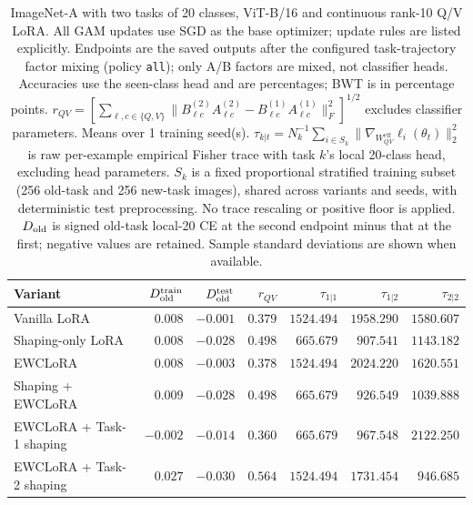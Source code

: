 \begin{table}[t]
\centering\scriptsize
\caption{ImageNet-A with two tasks of 20 classes, ViT-B/16 and continuous rank-10 Q/V LoRA. All GAM updates use SGD as the base optimizer; update rules are listed explicitly. Endpoints are the saved outputs after the configured task-trajectory factor mixing (policy \texttt{all}); only A/B factors are mixed, not classifier heads. Accuracies use the seen-class head and are percentages; BWT is in percentage points. $r_{QV}=\left[\sum_{\ell,c\in\{Q,V\}}\|B^{(2)}_{\ell c}A^{(2)}_{\ell c}-B^{(1)}_{\ell c}A^{(1)}_{\ell c}\|_F^2\right]^{1/2}$ excludes classifier parameters. Means over 1 training seed(s). $\tau_{k|t}=N_k^{-1}\sum_{i\in S_k}\|\nabla_{W^{\mathrm{eff}}_{QV}}\ell_i(\theta_t)\|_2^2$ is raw per-example empirical Fisher trace with task $k$'s local 20-class head, excluding head parameters. $S_k$ is a fixed proportional stratified training subset (256 old-task and 256 new-task images), shared across variants and seeds, with deterministic test preprocessing. No trace rescaling or positive floor is applied. $D_{\rm old}$ is signed old-task local-20 CE at the second endpoint minus that at the first; negative values are retained. Sample standard deviations are shown when available.}
\begin{tabular}{lrrrrrr}
\toprule
Variant & $D_{\rm old}^{\rm train}$ & $D_{\rm old}^{\rm test}$ & $r_{QV}$ & $\tau_{1|1}$ & $\tau_{1|2}$ & $\tau_{2|2}$ \\
\midrule
Vanilla LoRA & $0.008$ & $-0.001$ & $0.379$ & $1524.494$ & $1958.290$ & $1580.607$ \\
Shaping-only LoRA & $0.008$ & $-0.028$ & $0.498$ & $665.679$ & $907.541$ & $1143.182$ \\
EWCLoRA & $0.008$ & $-0.003$ & $0.378$ & $1524.494$ & $2024.220$ & $1620.551$ \\
Shaping + EWCLoRA & $0.009$ & $-0.028$ & $0.498$ & $665.679$ & $926.549$ & $1039.888$ \\
EWCLoRA + Task-1 shaping & $-0.002$ & $-0.014$ & $0.360$ & $665.679$ & $967.548$ & $2122.250$ \\
EWCLoRA + Task-2 shaping & $0.027$ & $-0.030$ & $0.564$ & $1524.494$ & $1731.454$ & $946.685$ \\
\bottomrule
\end{tabular}
\end{table}
